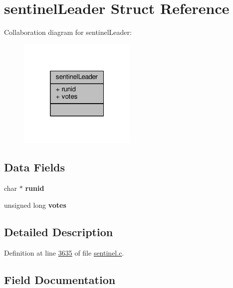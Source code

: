 \hypertarget{structsentinelLeader}{}\section{sentinel\+Leader Struct Reference}
\label{structsentinelLeader}


Collaboration diagram for sentinel\+Leader\+:\nopagebreak
\begin{figure}[H]
\begin{center}
\leavevmode
\includegraphics[width=160pt]{structsentinelLeader__coll__graph}
\end{center}
\end{figure}
\subsection*{Data Fields}
\begin{DoxyCompactItemize}
\item 
\mbox{\label{structsentinelLeader_aad6c26399a318f61a5eb261263b6c979}} 
char $\ast$ {\bfseries runid}
\item 
\mbox{\label{structsentinelLeader_ad9d9dc12f2d43bb190e65e09b433a804}} 
unsigned long {\bfseries votes}
\end{DoxyCompactItemize}


\subsection{Detailed Description}


Definition at line \hyperlink{sentinel_8c_source_l03635}{3635} of file \hyperlink{sentinel_8c_source}{sentinel.\+c}.



\subsection{Field Documentation}
\mbox{\label{structsentinelLeader_aad6c26399a318f61a5eb261263b6c979}} 
